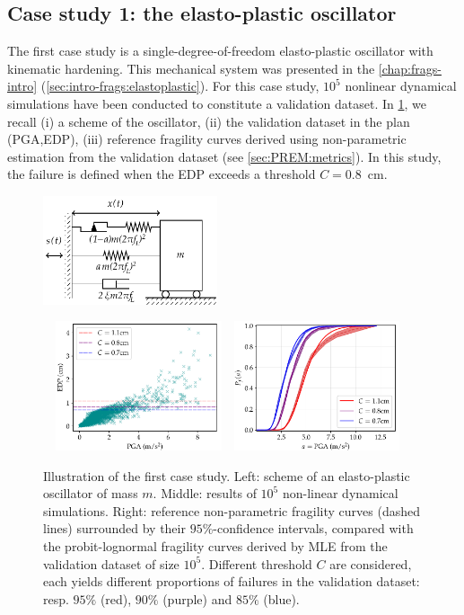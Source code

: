 \subsection{Case study 1: the elasto-plastic oscillator}


The first case study is a single-degree-of-freedom elasto-plastic oscillator
with kinematic hardening. This mechanical system was presented in the \cref{chap:frags-intro} (\cref{sec:intro-frags:elastoplastic}).
For this case study, $10^5$ nonlinear dynamical simulations have been conducted to constitute a validation dataset.
In \cref{fig:PREM:oscill}, we recall (i) a scheme of the oscillator, (ii) the validation dataset in the plan (PGA,EDP), (iii) reference fragility curves derived using non-parametric estimation from the validation dataset (see \cref{sec:PREM:metrics}).
In this study, the failure is defined when the EDP exceeds a threshold $C=0.8$~cm.

\begin{figure}[h]
    \centering
    \parbox[b][3.8cm][t]{5.2cm}{
        \includegraphics[height=3.2cm]{figures/intro-frags/KBEPO_rheo.pdf}}\ \ 
    \includegraphics[height=3.8cm]{figures/intro-frags/oscill/cloudPGA.pdf}\ \ 
    \includegraphics[height=3.8cm]{figures/intro-frags/oscill/refs_PGA.pdf}
    \caption{Illustration of the first case study. Left: scheme of an elasto-plastic oscillator of mass $m$. Middle: results of $10^5$ non-linear dynamical simulations. Right: reference non-parametric fragility curves (dashed lines) surrounded by their $95\%$-confidence intervals, compared with the probit-lognormal fragility curves derived by MLE from the validation dataset of size $10^5$. Different threshold $C$ are considered, each yields different proportions of failures in the validation dataset: resp. $95\%$ (red), $90\%$ (purple) and $85\%$ (blue).}
    \label{fig:PREM:oscill}
\end{figure}



